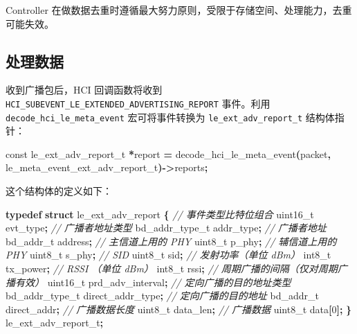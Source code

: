 \documentclass[
  12pt,
]{book}
\makeatletter
\newenvironment{Shaded}{\begin{snugshade}}{\end{snugshade}}
\newcommand{\CommentTok}[1]{\textcolor[rgb]{0.56,0.35,0.01}{\textit{#1}}}
\newcommand{\DataTypeTok}[1]{\textcolor[rgb]{0.13,0.29,0.53}{#1}}
\newcommand{\DecValTok}[1]{\textcolor[rgb]{0.00,0.00,0.81}{#1}}
\newcommand{\KeywordTok}[1]{\textcolor[rgb]{0.13,0.29,0.53}{\textbf{#1}}}
\newcommand{\NormalTok}[1]{#1}
\newcommand{\OperatorTok}[1]{\textcolor[rgb]{0.81,0.36,0.00}{\textbf{#1}}}
\newenvironment{kframe}{%
\medskip{}
\setlength{\fboxsep}{.8em}
 \def\at@end@of@kframe{}%
 \ifinner\ifhmode%
  \def\at@end@of@kframe{\end{minipage}}%
  \begin{minipage}{\columnwidth}%
 \fi\fi%
 \def\FrameCommand##1{\hskip\@totalleftmargin \hskip-\fboxsep
 \colorbox{shadecolor}{##1}\hskip-\fboxsep
     \hskip-\linewidth \hskip-\@totalleftmargin \hskip\columnwidth}%
 \MakeFramed {\advance\hsize-\width
   \@totalleftmargin\z@ \linewidth\hsize
   \@setminipage}}%
 {\par\unskip\endMakeFramed%
 \at@end@of@kframe}
\newenvironment{rmdblock}[1]
  {
  \begin{itemize}
  \renewcommand{\labelitemi}{
    \raisebox{-.7\height}[0pt][0pt]{
      {\setkeys{Gin}{width=3em,keepaspectratio}\texttt{[image: images/\#1]}}
    }
  }
  \setlength{\fboxsep}{1em}
  \begin{kframe}
  \item
  }
  {
  \end{kframe}
  \end{itemize}
  }
\newenvironment{rmdcaution}
  {\begin{rmdblock}{caution}}
  {\end{rmdblock}}
\makeatother
\begin{document}
\begin{rmdcaution}
Controller
在做数据去重时遵循最大努力原则，受限于存储空间、处理能力，去重可能失效。
\end{rmdcaution}

\hypertarget{ux5904ux7406ux6570ux636e}{%
\subsection{处理数据}\label{ux5904ux7406ux6570ux636e}}

收到广播包后，HCI 回调函数将收到 \texttt{HCI\_SUBEVENT\_LE\_EXTENDED\_ADVERTISING\_REPORT} 事件。利用 \texttt{decode\_hci\_le\_meta\_event}
宏可将事件转换为 \texttt{le\_ext\_adv\_report\_t} 结构体指针：

\begin{Shaded}
\begin{Highlighting}[]
\DataTypeTok{const}\NormalTok{ le\_ext\_adv\_report\_t }\OperatorTok{*}\NormalTok{report }\OperatorTok{=}
\NormalTok{  decode\_hci\_le\_meta\_event}\OperatorTok{(}\NormalTok{packet}\OperatorTok{,}\NormalTok{ le\_meta\_event\_ext\_adv\_report\_t}\OperatorTok{){-}\textgreater{}}\NormalTok{reports}\OperatorTok{;}
\end{Highlighting}
\end{Shaded}

这个结构体的定义如下：

\begin{Shaded}
\begin{Highlighting}[]
\KeywordTok{typedef} \KeywordTok{struct}\NormalTok{ le\_ext\_adv\_report}
\OperatorTok{\{}
    \CommentTok{// 事件类型比特位组合}
    \DataTypeTok{uint16\_t}\NormalTok{        evt\_type}\OperatorTok{;}
    \CommentTok{// 广播者地址类型}
\NormalTok{    bd\_addr\_type\_t  addr\_type}\OperatorTok{;}
    \CommentTok{// 广播者地址}
\NormalTok{    bd\_addr\_t       address}\OperatorTok{;}
    \CommentTok{// 主信道上用的 PHY}
    \DataTypeTok{uint8\_t}\NormalTok{         p\_phy}\OperatorTok{;}
    \CommentTok{// 辅信道上用的 PHY}
    \DataTypeTok{uint8\_t}\NormalTok{         s\_phy}\OperatorTok{;}
    \CommentTok{// SID}
    \DataTypeTok{uint8\_t}\NormalTok{         sid}\OperatorTok{;}
    \CommentTok{// 发射功率（单位 dBm）}
     \DataTypeTok{int8\_t}\NormalTok{         tx\_power}\OperatorTok{;}
    \CommentTok{// RSSI （单位 dBm）}
     \DataTypeTok{int8\_t}\NormalTok{         rssi}\OperatorTok{;}
    \CommentTok{// 周期广播的间隔（仅对周期广播有效）}
    \DataTypeTok{uint16\_t}\NormalTok{        prd\_adv\_interval}\OperatorTok{;}
    \CommentTok{// 定向广播的目的地址类型}
\NormalTok{    bd\_addr\_type\_t  direct\_addr\_type}\OperatorTok{;}
    \CommentTok{// 定向广播的目的地址}
\NormalTok{    bd\_addr\_t       direct\_addr}\OperatorTok{;}
    \CommentTok{// 广播数据长度}
    \DataTypeTok{uint8\_t}\NormalTok{         data\_len}\OperatorTok{;}
    \CommentTok{// 广播数据}
    \DataTypeTok{uint8\_t}\NormalTok{         data}\OperatorTok{[}\DecValTok{0}\OperatorTok{];}
\OperatorTok{\}}\NormalTok{ le\_ext\_adv\_report\_t}\OperatorTok{;}
\end{Highlighting}
\end{Shaded}
\end{document}

